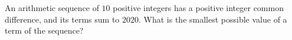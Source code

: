 An arithmetic sequence of $10$ positive integers has a positive integer common difference, and its terms sum to $2020$. What is the smallest possible value of a term of the sequence?
